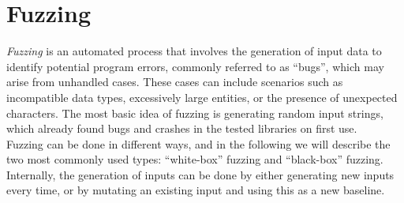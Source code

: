 \section{Fuzzing}
\label{sec:fuzzing}
\textit{Fuzzing} is an automated process that involves the generation of input data to identify potential program errors, commonly referred to as “bugs”, which may arise from unhandled cases. These cases can include scenarios such as incompatible data types, excessively large entities, or the presence of unexpected characters.
The most basic idea of fuzzing is generating random input strings, which already found bugs and crashes in the tested libraries on first use.~\cite{miller_empirical_1990}\\
Fuzzing can be done in different ways, and in the following we will describe the two most commonly used types: “white-box” fuzzing and “black-box” fuzzing.
Internally, the generation of inputs can be done by either generating new inputs every time, or by mutating an existing input and using this as a new baseline.~\cite{van_sprundel_fuzzing_2005}

